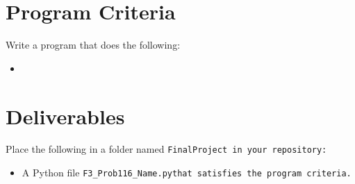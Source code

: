 \documentclass{article}
\def\prog#1{
\vspace{.1in}\begin{mdframed} \begin{center} \textbf{Programming Reminders} \end{center}#1 \end{mdframed} }
\newcommand\foldername{\tt{FinalProject} }
\newcommand\filename{\tt{F3\_Prob116\_Name.py}\;\;}
\begin{document}
	
	
 
 	
 	
 	
 	
 	
 	
 	

	
	
	
	
	
	
	
	




\section*{Program Criteria}
	Write a program that does the following:
	\begin{itemize}
		\item
	\end{itemize}







\section*{Deliverables}
	
	
	Place the following in a folder named \foldername in your repository:
	\begin{itemize}
		\item A Python file \filename  that satisfies the program criteria.
	\end{itemize}

	
\end{document}
